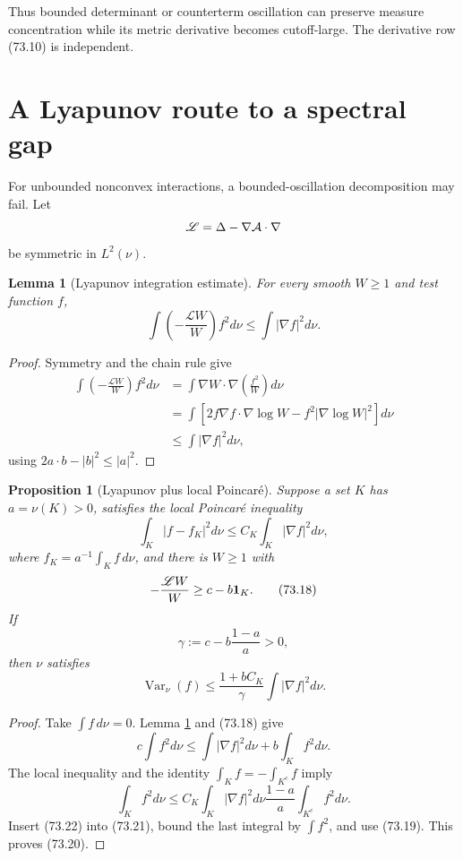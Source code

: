 \documentclass[11pt]{article}
\newtheorem{proposition}[theorem]{Proposition}
\newtheorem{lemma}[theorem]{Lemma}
\theoremstyle{remark}
\begin{document}
Thus bounded determinant or counterterm oscillation can preserve
measure concentration while its metric derivative becomes
cutoff-large.  The derivative row (73.10) is independent.

\section{A Lyapunov route to a spectral gap}

For unbounded nonconvex interactions, a bounded-oscillation
decomposition may fail.  Let
\[
 {\mathscr L}=\Delta-\nabla{\cal A}\mathbin{\cdot}\nabla
\]
be symmetric in \(L^2(\nu)\).

\begin{lemma}[Lyapunov integration estimate]
\label{lem:v15v73-lyapunov}
For every smooth \(W\geq1\) and test function \(f\),
\[
 \int\left(-\frac{{\mathscr L}W}{W}\right)f^2d\nu
 \leq\int|\nabla f|^2d\nu.                            \tag{73.16}
\]
\end{lemma}

\begin{proof}
Symmetry and the chain rule give
\[
\begin{split}
 \int\left(-\frac{{\mathscr L}W}{W}\right)f^2d\nu
 &=
 \int\nabla W\mathbin{\cdot}
 \nabla\left(\frac{f^2}{W}\right)d\nu\\
 &=
 \int\left[
 2f\nabla f\mathbin{\cdot}\nabla\log W
 -f^2|\nabla\log W|^2
 \right]d\nu\\
 &\leq\int|\nabla f|^2d\nu,
\end{split}
\]
using \(2a\cdot b-|b|^2\leq|a|^2\).
\end{proof}

\begin{proposition}[Lyapunov plus local Poincar\'e]
\label{prop:v15v73-poincare}
Suppose a set \(K\) has \(a=\nu(K)>0\), satisfies the local
Poincar\'e inequality
\[
 \int_K|f-f_K|^2d\nu
 \leq C_K\int_K|\nabla f|^2d\nu,                      \tag{73.17}
\]
where \(f_K=a^{-1}\int_Kf\,d\nu\), and there is \(W\geq1\) with
\[
 -\frac{{\mathscr L}W}{W}\geq c-b{\bf1}_K.            \tag{73.18}
\]
If
\[
 \gamma:=c-b\frac{1-a}{a}>0,                          \tag{73.19}
\]
then \(\nu\) satisfies
\[
 \operatorname{Var}_\nu(f)
 \leq
 \frac{1+bC_K}{\gamma}
 \int|\nabla f|^2d\nu.                                \tag{73.20}
\]
\end{proposition}

\begin{proof}
Take \(\int f\,d\nu=0\).  Lemma
\ref{lem:v15v73-lyapunov} and (73.18) give
\[
 c\int f^2d\nu
 \leq
 \int|\nabla f|^2d\nu+b\int_Kf^2d\nu.                 \tag{73.21}
\]
The local inequality and the identity
\(\int_Kf=-\int_{K^c}f\) imply
\[
 \int_Kf^2d\nu
 \leq
 C_K\int_K|\nabla f|^2d\nu
 \frac{1-a}{a}\int_{K^c}f^2d\nu.                      \tag{73.22}
\]
Insert (73.22) into (73.21), bound the last integral by
\(\int f^2\), and use (73.19).  This proves (73.20).
\end{proof}
\end{document}
